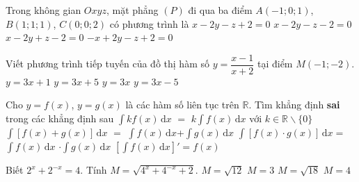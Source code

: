 \begin{ex}%
	Trong không gian $Oxyz$, mặt phẳng $(P)$ đi qua ba điểm $A(-1;0;1)$, $B(1;1;1)$, $C(0;0;2)$ có phương trình là
	\choice
	{\True $x-2y-z+2=0$  }
	{ $x-2y-z-2=0$  }
	{$x-2y+z-2=0$  }
	{$-x+2y-z+2=0$}
\end{ex}
\begin{ex}%
	Viết phương trình tiếp tuyến của đồ thị hàm số $y=\dfrac{x-1}{x+2}$ tại điểm $M(-1;-2)$.
	\choice
	{\True $y=3x+1$  }
	{$y=3x+5$  }
	{$y=3x$  }
	{$y=3x-5$  }
\end{ex}
\begin{ex}%
	Cho $y=f(x)$, $y=g(x)$ là các hàm số liên tục trên $\mathbb{R}$. Tìm khẳng định \textbf{sai} trong các khẳng định sau
	\choice
	{ $\displaystyle \int \limits kf(x) \mathrm{\,d}x$ $=$ $k\displaystyle \int \limits f(x) \mathrm{\,d}x$ với $k\in \mathbb{R} \backslash \{0\}$ }
	{$\displaystyle \int \limits \left[f(x)+g(x)\right] \mathrm{\,d}x$ $=$ $\displaystyle \int \limits f(x) \mathrm{\,d}x$+$\displaystyle \int \limits g(x) \mathrm{\,d}x$  }
	{\True  $\displaystyle \int \limits \left[f(x)\cdot g(x)\right] \mathrm{\,d}x=$ $\displaystyle \int \limits f(x) \mathrm{\,d}x$ $\cdot \displaystyle \int \limits g(x) \mathrm{\,d}x$ }
	{$\left[\displaystyle \int \limits f(x) \mathrm{\,d}x\right]'=f(x)$ }
\end{ex}
\begin{ex}%
	Biết $2^x+2^{-x}=4$. Tính $M=\sqrt{4^x+4^{-x}+2}$.
	\choice
	{$M=\sqrt{12}$  }
	{$M=3$  }
	{ $M=\sqrt{18}$ }
	{\True $M=4$  }
\end{ex}

